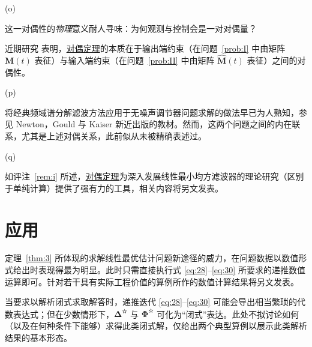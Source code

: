 \begin{remarkn}{(o)}\label{rem:o}

这一对偶性的\emph{物理}意义耐人寻味：为何观测与控制会是一对对偶量？


近期研究\cite{r29} 表明，\hyperref[thm:4]{对偶定理}的本质在于输出端约束（在问题~\ref{prob:I} 中由矩阵 $\bm{M}(t)$ 表征）与输入端约束（在问题~\ref{prob:II} 中由矩阵 $\hat{\bm{M}}(t)$ 表征）之间的对偶性。

\end{remarkn}

\begin{remarkn}{(p)}\label{rem:p}

将经典频域谱分解滤波方法应用于无噪声调节器问题求解的做法早已为人熟知，参见 Newton，Gould 与 Kaiser 新近出版的教材\cite{r27}。然而，这两个问题之间的内在联系，尤其是上述对偶关系，此前似从未被精确表述过。

\end{remarkn}

\begin{remarkn}{(q)}\label{rem:q}

如评注~\ref{rem:i} 所述，\hyperref[thm:4]{对偶定理}为深入发展线性最小均方滤波器的理论研究（区别于单纯计算）提供了强有力的工具，相关内容将另文发表\cite{r29}。

\end{remarkn}

\section{应用}\label{sec:app}

定理~\ref{thm:3} 所体现的求解线性最优估计问题新途径的威力，在问题数据以数值形式给出时表现得最为明显。此时只需直接执行式 \eqref{eq:28}–\eqref{eq:30} 所要求的递推数值运算即可。针对若干具有实际工程价值的算例所作的数值计算结果将另文发表。

当要求以解析闭式求取解答时，递推迭代 \eqref{eq:28}–\eqref{eq:30} 可能会导出相当繁琐的代数表达式；但在少数情形下，$\bm{\Delta}^{\text{✫}}$ 与 $\bm{\Phi}^{\text{✫}}$ 可化为“闭式”表达。此处不拟讨论如何（以及在何种条件下能够）求得此类闭式解，仅给出两个典型算例以展示此类解析结果的基本形态。

